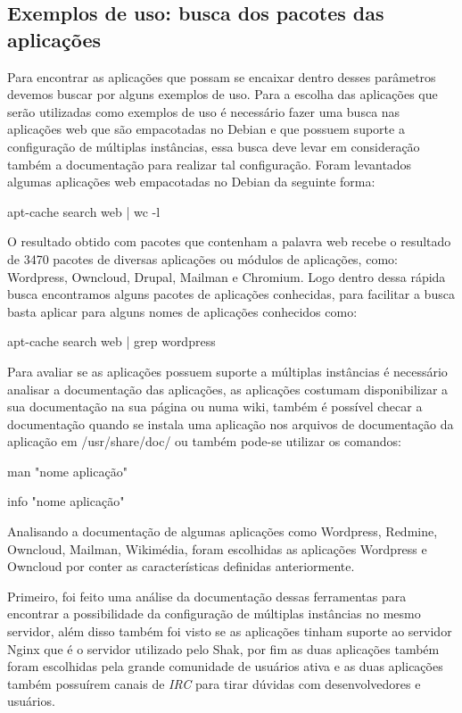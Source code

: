 \subsection{Exemplos de uso: busca dos pacotes das aplicações}
\label{subsection:exemplos}

Para encontrar as aplicações que possam se encaixar dentro desses parâmetros
devemos buscar por alguns exemplos de uso. Para a escolha das aplicações que
serão utilizadas como exemplos de uso é necessário fazer uma busca nas aplicações
web que são empacotadas no Debian e que possuem suporte a configuração de múltiplas
instâncias, essa busca deve levar em consideração também a documentação para realizar
tal configuração. Foram levantados algumas aplicações web empacotadas no Debian da
seguinte forma:

\begin{center}
apt-cache search web | wc -l
\end{center}

O resultado obtido com pacotes que contenham a palavra web recebe o resultado de 3470
pacotes de diversas aplicações ou módulos de aplicações, como:
Wordpress, Owncloud, Drupal, Mailman e Chromium. Logo dentro dessa rápida busca
encontramos alguns pacotes de aplicações conhecidas, para facilitar a busca basta
aplicar para alguns nomes de aplicações conhecidos como:

\begin{center}
apt-cache search web | grep wordpress
\end{center}

Para avaliar se as aplicações possuem suporte a múltiplas instâncias é necessário
analisar a documentação das aplicações, as aplicações costumam disponibilizar a sua
documentação na sua página ou numa wiki, também é possível checar a documentação
quando se instala uma aplicação nos arquivos de documentação da aplicação em
/usr/share/doc/ ou também pode-se utilizar os comandos:

\begin{center}
man "nome aplicação"

info "nome aplicação"
\end{center}

Analisando a documentação de algumas aplicações como Wordpress, Redmine,
Owncloud, Mailman, Wikimédia, foram escolhidas as aplicações Wordpress e Owncloud por
conter as características definidas anteriormente. 

Primeiro, foi feito uma análise da documentação dessas ferramentas para encontrar a
possibilidade da configuração de múltiplas instâncias no mesmo servidor, além
disso também foi visto se as aplicações tinham suporte ao servidor Nginx que é
o servidor utilizado pelo Shak, por fim as duas aplicações também foram escolhidas
pela grande comunidade de usuários ativa e as duas aplicações também possuírem
canais de \textit{IRC} para tirar dúvidas com desenvolvedores e usuários. 


